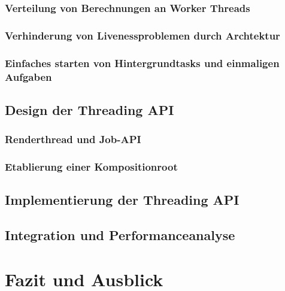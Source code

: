 \documentclass[12pt,a4paper,listof=totocnumbered,parskip=half]{scrreprt}
\begin{document}
\subsection{Verteilung von Berechnungen an Worker Threads}
\subsection{Verhinderung von Livenessproblemen durch Archtektur}
\subsection{Einfaches starten von Hintergrundtasks und einmaligen Aufgaben}

\section{Design der Threading API}

\subsection{Renderthread und Job-API}

\subsection{Etablierung einer Kompositionroot}

\section{Implementierung der Threading API}



\section{Integration und Performanceanalyse}

\chapter{Fazit und Ausblick}

\printnoidxglossaries

\printbibliography[title={Literaturverzeichnis},heading=bibintoc,notkeyword=online]

\printbibliography[title={Quellenverzeichnis},heading=bibintoc,keyword=online] 
\end{document}
